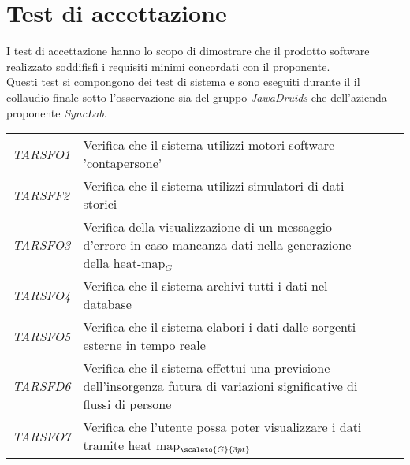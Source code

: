 {{{\section{Test di accettazione}\label{SpecificaDeiTestTestDiAccettazione}
I test di accettazione hanno lo scopo di dimostrare che il prodotto software realizzato soddifisfi i requisiti minimi concordati con il proponente. \\
Questi test si compongono dei test di sistema e sono eseguiti durante il il collaudio finale sotto l'osservazione sia del gruppo \textit{JawaDruids} che dell'azienda proponente \textit{SyncLab}.

\def\tabularxcolumn#1{m{#1}}
{

	\begin{center}
		\renewcommand{\arraystretch}{1.4}
		\begin{longtable}{|p{3cm}|p{8cm}|p{2cm}|p{2cm}|}
			\hline
			\rowcolor{airforceblue}
			\makecell[c]{\textbf{Id Test}} & \makecell[c]{\textbf{Descrizione}} & \makecell[c]{\textbf{Esito}} & \makecell[c]{\textbf{Qualità}} \\
			\hline
			\textit{TARSFO1} & Verifica che il sistema utilizzi motori software 'contapersone' & \makecell[tc]{\textit{I}} & \makecell[tc]{\textit{S}} \\
			\hline
			\textit{TARSFF2} & Verifica che il sistema utilizzi simulatori di dati storici & \makecell[tc]{\textit{NI}} & \makecell[tc]{\textit{-}}\\
			\hline
			\textit{TARSFO3} & Verifica della visualizzazione di un messaggio d'errore in caso mancanza dati nella generazione della heat-map$_G$ &\makecell[tc]{\textit{I}} & \makecell[tc]{\textit{S}}\\
			\hline
			\textit{TARSFO4} & Verifica che il sistema archivi tutti i dati nel database & \makecell[tc]{\textit{I}} & \makecell[tc]{\textit{S}}\\
			\hline
			\textit{TARSFO5} & Verifica che il sistema elabori i dati dalle sorgenti esterne in tempo reale & \makecell[tc]{\textit{I}} & \makecell[tc]{\textit{S}}\\
			\hline
			\textit{TARSFD6} & Verifica che il sistema effettui una previsione dell’insorgenza futura di variazioni significative di flussi di persone & \makecell[tc]{\textit{NI}} & \makecell[tc]{\textit{-}}\\
			\hline
			\textit{TARSFO7} & Verifica che l’utente possa poter visualizzare i dati tramite heat map$_{\scaleto{G}{3pt}}$ & \makecell[tc]{\textit{I}} & \makecell[tc]{\textit{S}}\\

\end{longtable}
\end{center}}}}}

